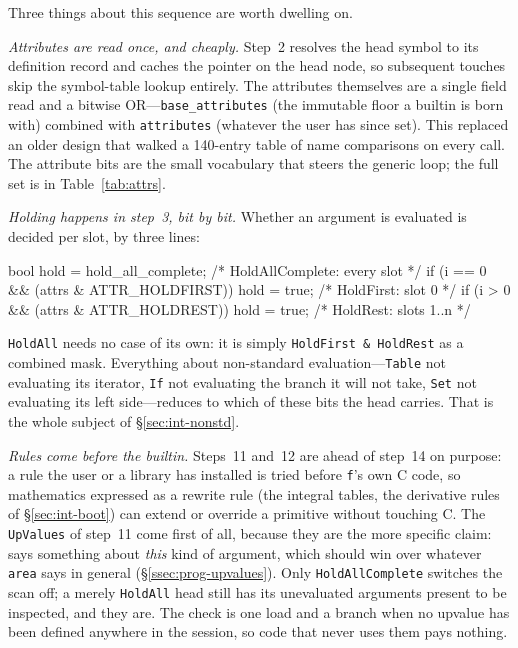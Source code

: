Three things about this sequence are worth dwelling on.

\emph{Attributes are read once, and cheaply.} Step~2 resolves the head symbol to its
definition record and caches the pointer on the head node, so subsequent touches skip
the symbol-table lookup entirely. The attributes themselves are a single field read
and a bitwise OR---\texttt{base\_attributes} (the immutable floor a builtin is born
with) combined with \texttt{attributes} (whatever the user has since set). This
replaced an older design that walked a 140-entry table of name comparisons on every
call. The attribute bits are the small vocabulary that steers the generic loop; the
full set is in Table~\ref{tab:attrs}.

\emph{Holding happens in step~3, bit by bit.} Whether an argument is evaluated is
decided per slot, by three lines:

\begin{ccode}
bool hold = hold_all_complete;                        /* HoldAllComplete: every slot */
if (i == 0 && (attrs & ATTR_HOLDFIRST)) hold = true;  /* HoldFirst: slot 0           */
if (i >  0 && (attrs & ATTR_HOLDREST))  hold = true;  /* HoldRest:  slots 1..n       */
\end{ccode}

\texttt{HoldAll} needs no case of its own: it is simply \texttt{HoldFirst \& HoldRest}
as a combined mask. Everything about non-standard evaluation---\texttt{Table} not
evaluating its iterator, \texttt{If} not evaluating the branch it will not take,
\texttt{Set} not evaluating its left side---reduces to which of these bits the head
carries. That is the whole subject of \S\ref{sec:int-nonstd}.

\emph{Rules come before the builtin.} Steps~11 and~12 are ahead of step~14 on purpose:
a rule the user or a library has installed is tried before \texttt{f}'s own C code, so mathematics expressed as a rewrite rule (the integral tables, the
derivative rules of \S\ref{sec:int-boot}) can extend or override a primitive without
touching C. The \texttt{UpValues} of step~11 come first of all, because they are the
more specific claim:  says
something about \emph{this} kind of argument, which should win over whatever
\texttt{area} says in general (\S\ref{ssec:prog-upvalues}). Only
\texttt{HoldAllComplete} switches the scan off; a merely \texttt{HoldAll} head still has
its unevaluated arguments present to be inspected, and they are. The check is one load
and a branch when no upvalue has been defined anywhere in the session, so code that never
uses them pays nothing.

